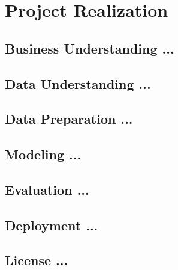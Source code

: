 \section{Project Realization}\label{sec:project-realization}

\subsection{Business Understanding ...}\label{subsec:businessunderstanding}

\subsection{Data Understanding ...}\label{subsec:dataunderstanding}

\subsection{Data Preparation ...}\label{subsec:datapreparation}

\subsection{Modeling ...}\label{subsec:modeling}

\subsection{Evaluation ...}\label{subsec:evaluation}

\subsection{Deployment ...}\label{subsec:deployment}

\subsection{License ...}\label{subsec:license}
